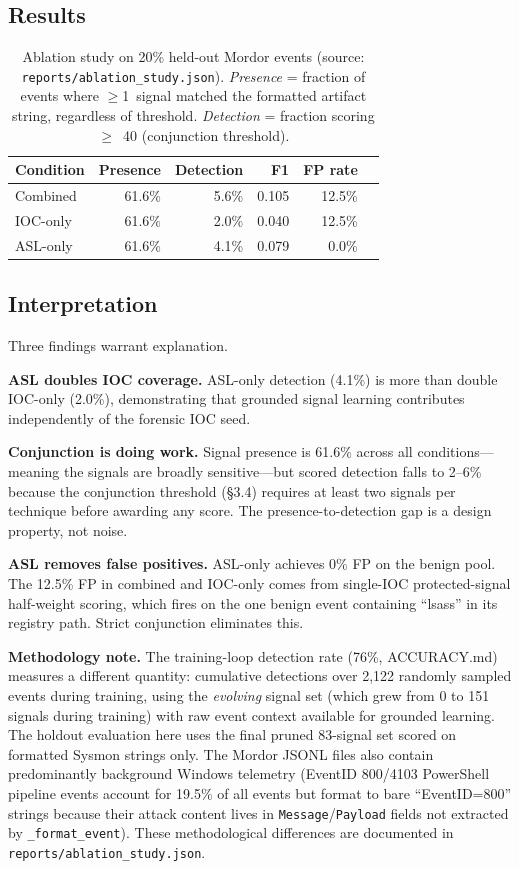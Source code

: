 \documentclass[sigconf, nonacm]{acmart}
\begin{document}
\subsection{Results}

\begin{table}[ht]
\centering
\caption{Ablation study on 20\% held-out Mordor events
  (source: \texttt{reports/ablation\_study.json}).
  \emph{Presence} = fraction of events where $\geq$1~signal matched the
  formatted artifact string, regardless of threshold.
  \emph{Detection} = fraction scoring $\geq$~40 (conjunction threshold).}
\label{tab:ablation}
\small
\begin{tabular}{@{}lrrrrr@{}}
\toprule
Condition & Presence & Detection & F1 & FP rate \\
\midrule
Combined  & 61.6\% & 5.6\%  & 0.105 & 12.5\% \\
IOC-only  & 61.6\% & 2.0\%  & 0.040 & 12.5\% \\
ASL-only  & 61.6\% & 4.1\%  & 0.079 &  0.0\% \\
\bottomrule
\end{tabular}
\end{table}

\subsection{Interpretation}

Three findings warrant explanation.

\textbf{ASL doubles IOC coverage.} ASL-only detection (4.1\%) is
more than double IOC-only (2.0\%), demonstrating that grounded signal
learning contributes independently of the forensic IOC seed.

\textbf{Conjunction is doing work.} Signal presence is 61.6\% across all
conditions---meaning the signals are broadly sensitive---but scored
detection falls to 2--6\% because the conjunction threshold (§3.4)
requires at least two signals per technique before awarding any score.
The presence-to-detection gap is a design property, not noise.

\textbf{ASL removes false positives.} ASL-only achieves 0\% FP on the
benign pool. The 12.5\% FP in combined and IOC-only comes from
single-IOC protected-signal half-weight scoring, which fires on the
one benign event containing ``lsass'' in its registry path. Strict
conjunction eliminates this.

\textbf{Methodology note.} The training-loop detection rate (76\%,
ACCURACY.md) measures a different quantity: cumulative detections over
2,122 randomly sampled events during training, using the \emph{evolving}
signal set (which grew from 0 to 151 signals during training) with raw
event context available for grounded learning. The holdout evaluation
here uses the final pruned 83-signal set scored on formatted Sysmon
strings only. The Mordor JSONL files also contain predominantly
background Windows telemetry (EventID 800/4103 PowerShell pipeline events
account for 19.5\% of all events but format to bare ``EventID=800'' strings
because their attack content lives in \texttt{Message}/\texttt{Payload}
fields not extracted by \texttt{\_format\_event}). These methodological
differences are documented in \texttt{reports/ablation\_study.json}.
\end{document}
